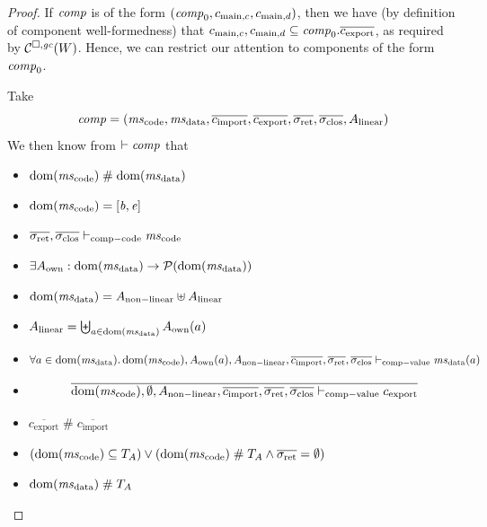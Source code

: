 \documentclass[a4paper]{article}
\begin{document}
\begin{proof}
  If $\mathit{comp}$ is of the form $(\mathit{comp}_0,c_{\mathrm{main},c}, c_{\mathrm{main},d})$, then we have (by definition of component well-formedness) that $c_{\mathrm{main},c}, c_{\mathrm{main},d} \subseteq \mathit{comp}_0.\overline{c_{\mathrm{export}}}$, as required by $\mathcal{C}^{\square,\mathit{gc}}(W)$.
  Hence, we can restrict our attention to components of the form $\mathit{comp}_0$.

  Take
  \begin{equation*}
    \var{comp} = (\mscode,\msdata,\overline{c_{\mathrm{import}}},\overline{c_{\mathrm{export}}},\sigrets,\sigcloss,A_\linear)
  \end{equation*}
  We then know from $\vdash \mathit{comp}$ that 
  \begin{itemize}
  \item $\dom(\mscode) \mathrel{\#} \dom(\msdata)$
  \item $\dom(\mscode) = [\baddr,\eaddr]$
  \item $\sigrets,\sigcloss \vdash_{\mathrm{comp-code}} \mscode$
  \item $\exists A_\mathrm{own} : \dom(\msdata) \rightarrow \powerset{\dom(\msdata)}$
  \item $\dom(\msdata) = A_{\mathrm{non-linear}} \uplus A_\linear$
  \item $A_\linear = \biguplus_{a \in \dom(\msdata)} A_{\mathrm{own}}(a)$
  \item
    \begin{equation*}
      \forall a \in \dom(\msdata)\ldotp \dom(\mscode),A_{\mathrm{own}}(a),A_{\mathrm{non-linear}},\overline{c_{\mathrm{import}}},\sigrets,\sigcloss \vdash_{\mathrm{comp-value}} \msdata(a)
    \end{equation*}
  \item
    \begin{equation*}
      \overline{\dom(\mscode), \emptyset, A_{\mathrm{non-linear}}, \overline{c_{\mathrm{import}}}, \sigrets,\sigcloss \vdash_{\mathrm{comp-value}} c_{\mathrm{export}}}
    \end{equation*}
  \item $\overline{c_{\mathrm{export}}} \mathrel{\#} \overline{c_{\mathrm{import}}}$
  \item $(\dom(\mscode) \subseteq \ta) \vee (\dom(\mscode) \mathrel{\#} \ta \wedge \sigrets = \emptyset)$
  \item $\dom(\msdata) \mathrel{\#} \ta$
  \end{itemize}


\end{proof}
\end{document}
